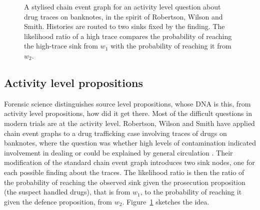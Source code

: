 \begin{figure}[t]
\centering
{}
\caption{A stylised chain event graph for an activity level question about drug traces on banknotes, in the spirit of Robertson, Wilson and Smith. Histories are routed to two sinks fixed by the finding. The likelihood ratio of a high trace compares the probability of reaching the high-trace sink from $w_1$ with the probability of reaching it from $w_2$.}
\label{fig:ceg}
\end{figure}

\subsection{Activity level propositions}

Forensic science distinguishes source level propositions, whose DNA is this, from activity level propositions, how did it get there. Most of the difficult questions in modern trials are at the activity level. Robertson, Wilson and Smith have applied chain event graphs to a drug trafficking case involving traces of drugs on banknotes, where the question was whether high levels of contamination indicated involvement in dealing or could be explained by general circulation \citep{robertson2024}. Their modification of the standard chain event graph introduces two sink nodes, one for each possible finding about the traces. The likelihood ratio is then the ratio of the probability of reaching the observed sink given the prosecution proposition (the suspect handled drugs), that is from $w_1$, to the probability of reaching it given the defence proposition, from $w_2$. Figure~\ref{fig:ceg} sketches the idea.


